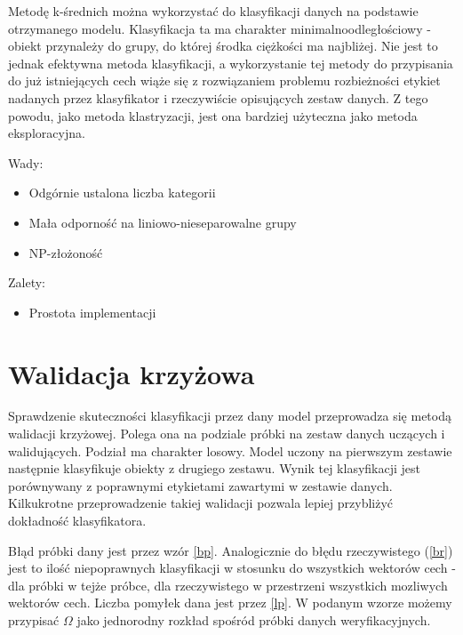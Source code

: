 \documentclass[12pt,a4paper,oneside]{report} %
\begin{document}
Metodę k-średnich można wykorzystać do klasyfikacji danych na podstawie otrzymanego modelu. Klasyfikacja ta ma charakter minimalnoodległościowy - obiekt przynależy do grupy, do której środka ciężkości ma najbliżej. Nie jest to jednak efektywna metoda klasyfikacji, a wykorzystanie tej metody do przypisania do już istniejących cech wiąże się z rozwiązaniem problemu rozbieżności etykiet nadanych przez klasyfikator i rzeczywiście opisujących zestaw danych. Z tego powodu, jako metoda klastryzacji, jest ona bardziej użyteczna jako metoda eksploracyjna. \par
\vspace{0.5cm}
Wady:\par
\begin{itemize}
\item Odgórnie ustalona liczba kategorii
\item Mała odporność na liniowo-nieseparowalne grupy
\item NP-złożoność
\end{itemize}\par
Zalety:\par
\begin{itemize}
\item Prostota implementacji
\end{itemize}\par



\section{Walidacja krzyżowa}

Sprawdzenie skuteczności klasyfikacji przez dany model przeprowadza się metodą walidacji krzyżowej. Polega ona na podziale próbki na zestaw danych uczących i walidujących. Podział ma charakter losowy. Model uczony na pierwszym zestawie następnie klasyfikuje obiekty z drugiego zestawu. Wynik tej klasyfikacji jest porównywany z poprawnymi etykietami zawartymi w zestawie danych. Kilkukrotne przeprowadzenie takiej walidacji pozwala lepiej przybliżyć dokładność klasyfikatora.\par

Błąd próbki dany jest przez wzór \ref{bp}. Analogicznie do błędu rzeczywistego (\ref{br}) jest to ilość niepoprawnych klasyfikacji w stosunku do wszystkich wektorów cech - dla próbki w tejże próbce, dla rzeczywistego w przestrzeni wszystkich mozliwych wektorów cech. Liczba pomyłek dana jest przez \ref{lp}. W podanym wzorze możemy przypisać $\Omega$ jako jednorodny rozkład spośród próbki danych weryfikacyjnych.
\end{document}
